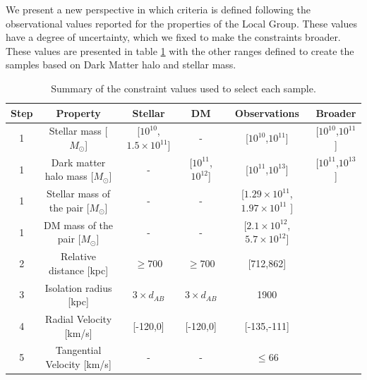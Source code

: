 \documentclass[fleqn,usenatbib]{mnras}
\begin{document}
We present a new perspective in which criteria is defined following the observational values reported for the properties of the Local Group. These values have a degree of uncertainty, which we fixed to make the constraints broader. These values are presented in table \ref{tab:constraints} with the other ranges defined to create the samples based on Dark Matter halo and stellar mass.  
\begin{table} 
\begin{center}
\caption{Summary of the constraint values used to select each sample.}
\label{tab:constraints}
\begin{tabular}{|c| c | c | c | c | c |}
\hline
Step &Property & Stellar & DM &Observations & Broader\\ \hline
1&Stellar mass [$M_\odot$] &[$10^{10}$,$1.5\times 10^{11}$] & -& [$10^{10}$,$10^{11}$]& [$10^{10}$,$10^{11}$]\\

1& Dark matter halo mass [$M_\odot$]& -& [$10^{11}$,$10^{12}$]&[$10^{11}$,$10^{13}$]&[$10^{11}$,$10^{13}$] \\

1 & Stellar mass of the pair [$M_\odot$] &- & -& [$1.29\times10^{11}$,$1.97\times10^{11}$ ]& \\

1 & DM mass of the pair [$M_\odot$]& -& -&[$2.1\times 10^{12}$, $5.7\times 10^{12}$] & \\

2& Relative distance  [kpc]&$\geq700$ &$\geq 700$& [712,862] & \\

3& Isolation radius [kpc]& $3\times d_{AB}$&$3\times d_{AB}$& 1900& \\

4& Radial Velocity [km/s]&[-120,0] & [-120,0]& [-135,-111]& \\
5 & Tangential Velocity [km/s]& -& -& $\leq 66$& \\

\end{tabular}
\end{center}
\end{table}
\end{document}
